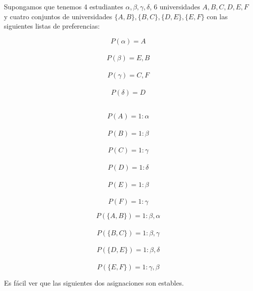 \begin{eje} \cite{Todo}
Supongamos que tenemos 4 estudiantes $\alpha,\beta,\gamma,\delta$, 6 universidades $A,B,C,D,E,F$ y cuatro conjuntos de universidades $\{A,B\},\{B,C\},\{D,E\},\{E,F\}$ con las siguientes listas de preferencias:
\noindent \begin{minipage}{.3\linewidth}
$$P(\alpha)=A$$ \\
$$P(\beta)=E,B$$ \\
$$P(\gamma)=C,F$$ \\
$$P(\delta)=D$$ \\
\end{minipage}%
\begin{minipage}{.3\linewidth}
$$P(A)=1:\alpha$$ \\
$$P(B)=1:\beta$$ \\
$$P(C)=1: \gamma$$ \\
$$P(D)=1: \delta$$ \\
$$P(E)=1: \beta$$ \\
$$P(F)=1: \gamma$$ 
\end{minipage}
\begin{minipage}{.4\linewidth}
$$P(\{A,B\})= 1:\beta,\alpha$$ \\
$$P(\{B,C\})=1:\beta,\gamma$$ \\
$$P(\{D,E\})= 1:\beta,\delta$$ \\
$$P(\{E,F\})=1:\gamma,\beta$$
\end{minipage}

Es fácil ver que las siguientes dos asignaciones son estables.\\

\begin{figure}[H]
\begin{minipage}{.5\linewidth}
\begin{figure}[H]\centering

\end{figure}
\end{minipage}
\end{figure}
\end{eje}
